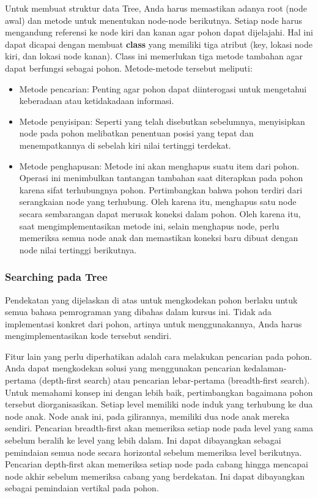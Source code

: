 \documentclass{article}
\begin{document}
Untuk membuat struktur data Tree, Anda harus memastikan adanya root (node awal) dan metode untuk menentukan node-node berikutnya. Setiap node harus mengandung referensi ke node kiri dan kanan agar pohon dapat dijelajahi. Hal ini dapat dicapai dengan membuat \textbf{class} yang memiliki tiga atribut (key, lokasi node kiri, dan lokasi node kanan). Class ini memerlukan tiga metode tambahan agar dapat berfungsi sebagai pohon. Metode-metode tersebut meliputi:
\begin{itemize}
    \item Metode pencarian: Penting agar pohon dapat diinterogasi untuk mengetahui keberadaan atau ketidakadaan informasi.
    \item Metode penyisipan: Seperti yang telah disebutkan sebelumnya, menyisipkan node pada pohon melibatkan penentuan posisi yang tepat dan menempatkannya di sebelah kiri nilai tertinggi terdekat.
    \item Metode penghapusan: Metode ini akan menghapus suatu item dari pohon. Operasi ini menimbulkan tantangan tambahan saat diterapkan pada pohon karena sifat terhubungnya pohon. Pertimbangkan bahwa pohon terdiri dari serangkaian node yang terhubung. Oleh karena itu, menghapus satu node secara sembarangan dapat merusak koneksi dalam pohon. Oleh karena itu, saat mengimplementasikan metode ini, selain menghapus node, perlu memeriksa semua node anak dan memastikan koneksi baru dibuat dengan node nilai tertinggi berikutnya.
\end{itemize}

\subsubsection{Searching pada Tree}
Pendekatan yang dijelaskan di atas untuk mengkodekan pohon berlaku untuk semua bahasa pemrograman yang dibahas dalam kursus ini. Tidak ada implementasi konkret dari pohon, artinya untuk menggunakannya, Anda harus mengimplementasikan kode tersebut sendiri.

Fitur lain yang perlu diperhatikan adalah cara melakukan pencarian pada pohon. Anda dapat mengkodekan solusi yang menggunakan pencarian kedalaman-pertama (depth-first search) atau pencarian lebar-pertama (breadth-first search). Untuk memahami konsep ini dengan lebih baik, pertimbangkan bagaimana pohon tersebut diorganisasikan. Setiap level memiliki node induk yang terhubung ke dua node anak. Node anak ini, pada gilirannya, memiliki dua node anak mereka sendiri. Pencarian breadth-first akan memeriksa setiap node pada level yang sama sebelum beralih ke level yang lebih dalam. Ini dapat dibayangkan sebagai pemindaian semua node secara horizontal sebelum memeriksa level berikutnya. Pencarian depth-first akan memeriksa setiap node pada cabang hingga mencapai node akhir sebelum memeriksa cabang yang berdekatan. Ini dapat dibayangkan sebagai pemindaian vertikal pada pohon.
\end{document}
